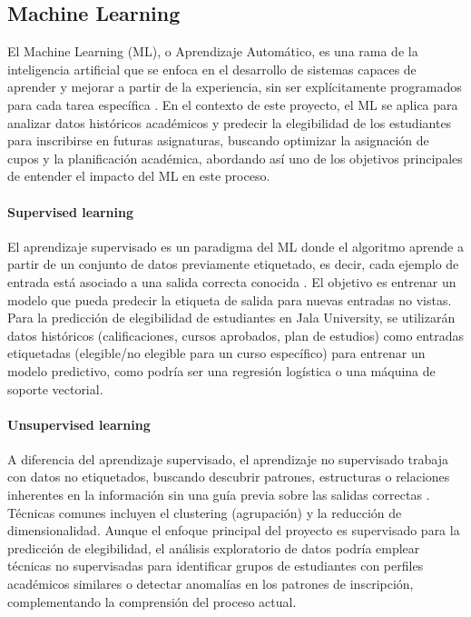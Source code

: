 \subsection{Machine Learning}
El Machine Learning (ML), o Aprendizaje Automático, es una rama de la inteligencia artificial que se enfoca en el desarrollo de sistemas capaces de aprender y mejorar a partir de la experiencia, sin ser explícitamente programados para cada tarea específica \parencite{Samuel1959}.
En el contexto de este proyecto, el ML se aplica para analizar datos históricos académicos y predecir la elegibilidad de los estudiantes para inscribirse en futuras asignaturas, buscando optimizar la asignación de cupos y la planificación académica, abordando así uno de los objetivos principales de entender el impacto del ML en este proceso.

\paragraph{Supervised learning}
El aprendizaje supervisado es un paradigma del ML donde el algoritmo aprende a partir de un conjunto de datos previamente etiquetado, es decir, cada ejemplo de entrada está asociado a una salida correcta conocida \parencite{Bishop2006}.
El objetivo es entrenar un modelo que pueda predecir la etiqueta de salida para nuevas entradas no vistas.
Para la predicción de elegibilidad de estudiantes en Jala University, se utilizarán datos históricos (calificaciones, cursos aprobados, plan de estudios) como entradas etiquetadas (elegible/no elegible para un curso específico) para entrenar un modelo predictivo, como podría ser una regresión logística o una máquina de soporte vectorial.

\paragraph{Unsupervised learning}
A diferencia del aprendizaje supervisado, el aprendizaje no supervisado trabaja con datos no etiquetados, buscando descubrir patrones, estructuras o relaciones inherentes en la información sin una guía previa sobre las salidas correctas \parencite{Hastie2009}.
Técnicas comunes incluyen el clustering (agrupación) y la reducción de dimensionalidad.
Aunque el enfoque principal del proyecto es supervisado para la predicción de elegibilidad, el análisis exploratorio de datos podría emplear técnicas no supervisadas para identificar grupos de estudiantes con perfiles académicos similares o detectar anomalías en los patrones de inscripción, complementando la comprensión del proceso actual.


